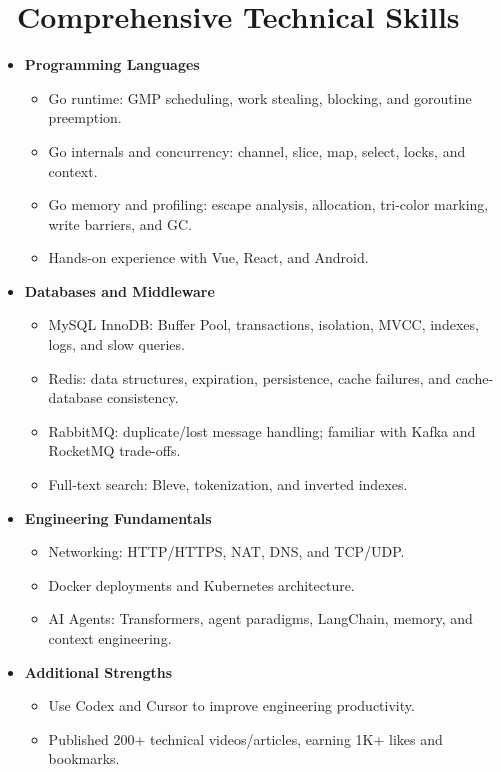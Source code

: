 \documentclass{styles/resume}
\begin{document}
\section{\faCogs\ Comprehensive Technical Skills}
\begin{itemize}
    \item \textbf{Programming Languages}
    \begin{itemize}
        \item Go runtime: GMP scheduling, work stealing, blocking, and goroutine preemption.
        \item Go internals and concurrency: channel, slice, map, select, locks, and context.
        \item Go memory and profiling: escape analysis, allocation, tri-color marking, write barriers, and GC.
        \item Hands-on experience with Vue, React, and Android.
    \end{itemize}

    \item \textbf{Databases and Middleware}
    \begin{itemize}
        \item MySQL InnoDB: Buffer Pool, transactions, isolation, MVCC, indexes, logs, and slow queries.
        \item Redis: data structures, expiration, persistence, cache failures, and cache-database consistency.
        \item RabbitMQ: duplicate/lost message handling; familiar with Kafka and RocketMQ trade-offs.
        \item Full-text search: Bleve, tokenization, and inverted indexes.
    \end{itemize}

    \item \textbf{Engineering Fundamentals}
    \begin{itemize}
        \item Networking: HTTP/HTTPS, NAT, DNS, and TCP/UDP.
        \item Docker deployments and Kubernetes architecture.
        \item AI Agents: Transformers, agent paradigms, LangChain, memory, and context engineering.
    \end{itemize}

    \item \textbf{Additional Strengths}
    \begin{itemize}
        \item Use Codex and Cursor to improve engineering productivity.
        \item Published 200+ technical videos/articles, earning 1K+ likes and bookmarks.
    \end{itemize}
\end{itemize}
\end{document}
